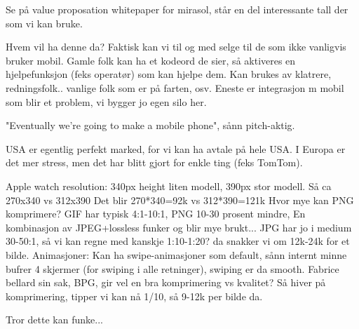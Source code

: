 Se på value proposation whitepaper for mirasol, står en del interessante tall
der som vi kan bruke.

Hvem vil ha denne da? Faktisk kan vi til og med selge til de som ikke vanligvis
bruker mobil. Gamle folk kan ha et kodeord de sier, så aktiveres en
hjelpefunksjon (feks operatør) som kan hjelpe dem. Kan brukes av klatrere,
redningsfolk.. vanlige folk som er på farten, osv. Eneste er integrasjon m
mobil som blir et problem, vi bygger jo egen silo her.

"Eventually we're going to make a mobile phone", sånn pitch-aktig.

USA er egentlig perfekt marked, for vi kan ha avtale på hele USA. I Europa er
det mer stress, men det har blitt gjort for enkle ting (feks TomTom).

Apple watch resolution: 340px height liten modell, 390px stor modell.
Så ca 270x340 vs 312x390
Det blir 270*340=92k vs 312*390=121k
Hvor mye kan PNG komprimere? GIF har typisk 4:1-10:1, PNG 10-30 prosent mindre,
En kombinasjon av JPEG+lossless funker og blir mye brukt... JPG har jo i medium
30-50:1, så vi kan regne med kanskje 1:10-1:20? da snakker vi om 12k-24k for et
bilde. Animasjoner: Kan ha swipe-animasjoner som default, sånn internt minne
bufrer 4 skjermer (for swiping i alle retninger), swiping er da smooth.
Fabrice bellard sin sak, BPG, gir vel en bra komprimering vs kvalitet?
Så hiver på komprimering, tipper vi kan nå 1/10, så 9-12k per bilde da.

Tror dette kan funke...
